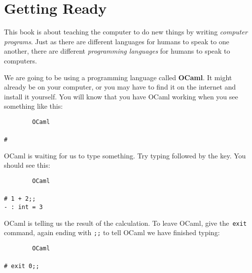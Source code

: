 \documentclass[]{book}
\newcommand{\smspace}{\vspace{4mm}}
\begin{document}
\pagestyle{empty}


\chapter{Getting Ready}

This book is about teaching the computer to do new things by writing \textit{computer programs}. Just as there are different languages for humans to speak to one another, there are different \textit{programming languages} for humans to speak to computers.

We are going to be using a programming language called \textbf{OCaml}. It might already be on your computer, or you may have to find it on the internet and install it yourself. You will know that you have OCaml working when you see something like this:

\smspace
\noindent\verb!        OCaml!\\
\noindent\\
\noindent\verb!#!
\smspace


{\setlength\fboxsep{1.75pt}%

\noindent OCaml is waiting for us to type something. Try typing  followed by the  key. You should see this:

}

\smspace
\noindent\verb!        OCaml!\\
\noindent\\
\noindent\verb!# 1 + 2;;!\\
\noindent\verb!- : int = 3!
\smspace

\noindent OCaml is telling us the result of the calculation. To leave OCaml, give the \,\texttt{exit\!}\, command, again ending with \verb!;;! to tell OCaml we have finished typing:

\smspace
\noindent\verb!        OCaml!\\
\noindent\\
\noindent\verb!# exit 0;;!
\smspace
\end{document}
